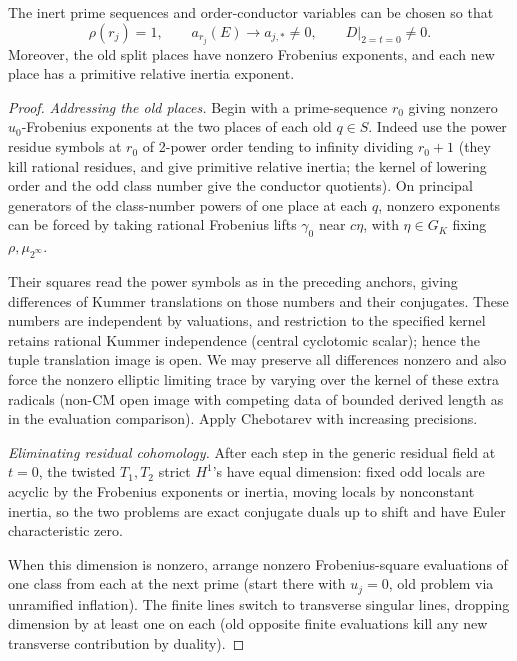 \begin{lemma}\label{cyclic:addressing}
The inert prime sequences and order-conductor variables can be chosen
so that
\[
 \rho(r_j)=1,\qquad a_{r_j}(E)\longrightarrow a_{j,*}\ne0,
 \qquad D\big|_{2=t=0}\ne0.
\]
Moreover, the old split places have nonzero Frobenius exponents, and
each new place has a primitive relative inertia exponent.
\end{lemma}

\begin{proof}
\emph{Addressing the old places.}  Begin with a prime-sequence \(r_0\) giving
nonzero \(u_0\)-Frobenius exponents at the two places of each old \(q\in S\).
Indeed use the power residue symbols at \(r_0\) of 2-power order tending to
infinity dividing \(r_0+1\) (they kill rational residues, and give primitive
relative inertia; the kernel of lowering order and the odd class number give
the conductor quotients). On principal generators of the class-number powers
of one place at each \(q\), nonzero exponents can be forced by taking rational
Frobenius lifts \(\gamma_0\) near \(c\eta\), with \(\eta\in G_K\) fixing
\(\rho,\mu_{2^\infty}\).

Their squares read the power symbols as in the preceding anchors, giving
differences of Kummer translations on those numbers and their conjugates.
These numbers are independent by valuations, and restriction to the specified
kernel retains rational Kummer independence (central cyclotomic scalar); hence
the tuple translation image is open. We may preserve all differences nonzero
and also force the nonzero elliptic limiting trace by varying over the kernel
of these extra radicals (non-CM open image with competing data of bounded
derived length as in the evaluation comparison). Apply Chebotarev with
increasing precisions.

\par\smallskip
\emph{Eliminating residual cohomology.}  After each step in the generic
residual field at \(t=0\), the twisted \(T_1,T_2\) strict \(H^1\)'s have equal
dimension: fixed odd locals are acyclic by the Frobenius exponents or inertia,
moving locals by nonconstant inertia, so the two problems are exact conjugate
duals up to shift and have Euler characteristic zero.

When this dimension is nonzero, arrange nonzero Frobenius-square evaluations
of one class from each at the next prime (start there with \(u_j=0\), old
problem via unramified inflation). The finite lines switch to transverse
singular lines, dropping dimension by at least one on each (old opposite
finite evaluations kill any new transverse contribution by duality).


\end{proof}
